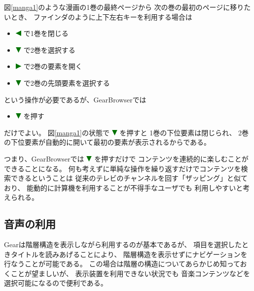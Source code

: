 \documentclass[twoside]{wiss}
\def\GEAR{\textsf{Gear}}
\def\GB{\textsf{GearBrowser}}
\def\down{ \includegraphics[width=3mm,bb=0 0 36 36]{figures/downtriangle.pdf} }
\def\right{ \includegraphics[width=3mm,bb=0 0 36 36]{figures/righttriangle.pdf} }
\def\left{ \includegraphics[width=3mm,bb=0 0 36 36]{figures/lefttriangle.pdf} }
\begin{document}
\noindent
図\ref{manga1}のような漫画の1巻の最終ページから
次の巻の最初のページに移りたいとき、
ファインダのように上下左右キーを利用する場合は

\begin{itemize}
\item {\left}で1巻を閉じる
\item {\down}で2巻を選択する
\item {\right}で2巻の要素を開く
\item {\down}で2巻の先頭要素を選択する
\end{itemize}

\noindent
という操作が必要であるが、{\GB}では

\begin{itemize}
\item {\down}を押す
\end{itemize}

\noindent
だけでよい。
図\ref{manga1}の状態で{\down}を押すと
1巻の下位要素は閉じられ、
2巻の下位要素が自動的に開いて最初の要素が表示されるからである。

つまり、{\GB}では{\down}を押すだけで
コンテンツを連続的に楽しむことができることになる。
何も考えずに単純な操作を繰り返すだけでコンテンツを検索できるということは
従来のテレビのチャンネルを回す「ザッピング」と似ており、
能動的に計算機を利用することが不得手なユーザでも
利用しやすいと考えられる。


\subsection{音声の利用}

{\GEAR}は階層構造を表示しながら利用するのが基本であるが、
項目を選択したときタイトルを読みあげることにより、
階層構造を表示せずにナビゲーションを行なうことが可能である。
この場合は階層の構造についてあらかじめ知っておくことが望ましいが、
表示装置を利用できない状況でも
音楽コンテンツなどを選択可能になるので便利である。

% 
\end{document}
